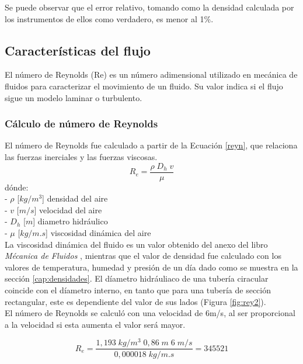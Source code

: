 Se puede observar que el error relativo, tomando como la densidad calculada por los instrumentos de ellos como verdadero, es menor al 1\%.  


\subsection{Características del flujo}
\begin{tcolorbox}[colback=blue!5!white,colframe=blue!75!black,title=Número de Reynolds]
	El número de Reynolds (Re) es un número adimensional utilizado en mecánica de fluidos para caracterizar el movimiento de un fluido. Su valor indica si el flujo sigue un modelo laminar o turbulento.
\end{tcolorbox}

\subsubsection{Cálculo de número de Reynolds}
	El número de Reynolds fue calculado a partir de la Ecuación \ref{reyn}, que relaciona las fuerzas inerciales y las fuerzas viscosas. 
\begin{equation}	
	R_e=\frac{\rho\;D_h\;v}\mu
	\label{reyn}
\end{equation}	
dónde:\\
- \textbf{$\rho$ } [$kg/m^{3}$] densidad del aire \\
- \textbf{$v$ } [$m/s$] velocidad del aire\\
- \textbf{$D_h$ } [$m$] diametro hidráulico\\
- \textbf{$\mu$ } [$kg/m.s$] viscosidad dinámica del aire\\


La viscosidad dinámica del fluido es un valor obtenido del anexo del libro \textit{Mécanica de Fluidos} \cite{yunus2006mecanica}, mientras que el valor de densidad fue calculado con los valores de temperatura, humedad y presión de un día dado como se muestra en la sección \ref{cap:densidades}.
El díametro hidráuliaco de una tubería ciracular coincide con el díametro interno, en tanto que para una tubería de sección rectangular, este es dependiente del valor de sus lados (Figura \ref{fig:rey2}). \cite{licci2020estudio}\\
El número de Reynolds se calculó con una velocidad de 6m/s, al ser proporcional a la velocidad si esta aumenta el valor será mayor.

\begin{equation}	
	R_e=\frac{1,193\;kg/m^{3}\;0,86\;m\;6\;m/s}{0,000018\;kg/m.s}=345521
	\label{reyn2}
\end{equation}	

